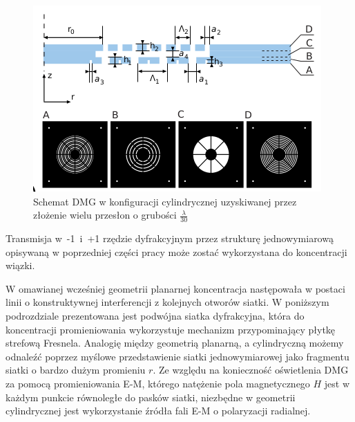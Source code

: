\begin{figure}
	\includegraphics[width=\textwidth]{images/dmg/express_siatki.png}
	\caption{Schemat DMG w konfiguracji cylindrycznej uzyskiwanej przez złożenie wielu przesłon o grubości $\frac{\lambda}{30}$ \cite{Yavorskiy:14}}
	\label{fig:schem-cyl}
\end{figure}

Transmisja w~-1~i~+1 rzędzie dyfrakcyjnym przez strukturę jednowymiarową opisywaną w poprzedniej części pracy może zostać wykorzystana do koncentracji wiązki. 

W omawianej wcześniej geometrii planarnej koncentracja następowała w postaci linii o konstruktywnej interferencji z kolejnych otworów siatki. W poniższym podrozdziale prezentowana jest podwójna siatka dyfrakcyjna, która do koncentracji promieniowania wykorzystuje mechanizm przypominający płytkę strefową Fresnela. Analogię między geometrią planarną, a cylindryczną możemy odnaleźć poprzez myślowe przedstawienie siatki jednowymiarowej jako fragmentu siatki o bardzo dużym promieniu $r$. Ze względu na konieczność oświetlenia DMG za pomocą promieniowania E-M, którego natężenie pola magnetycznego $H$ jest w każdym punkcie równoległe do pasków siatki, niezbędne w geometrii cylindrycznej jest wykorzystanie źródła fali E-M o polaryzacji radialnej. 



